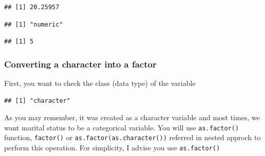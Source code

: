 \documentclass[
]{article}
\newenvironment{Shaded}{\begin{snugshade}}{\end{snugshade}}
\newcommand{\CommentTok}[1]{\textcolor[rgb]{0.56,0.35,0.01}{\textit{#1}}}
\newcommand{\FunctionTok}[1]{\textcolor[rgb]{0.13,0.29,0.53}{\textbf{#1}}}
\newcommand{\NormalTok}[1]{#1}
\newcommand{\OtherTok}[1]{\textcolor[rgb]{0.56,0.35,0.01}{#1}}
\newcommand{\SpecialCharTok}[1]{\textcolor[rgb]{0.81,0.36,0.00}{\textbf{#1}}}
\begin{document}
\begin{verbatim}
## [1] 20.25957
\end{verbatim}

\begin{Shaded}
\end{Shaded}

\begin{verbatim}
## [1] "numeric"
\end{verbatim}

\begin{Shaded}
\end{Shaded}

\begin{verbatim}
## [1] 5
\end{verbatim}

\hypertarget{converting-a-character-into-a-factor}{%
\subsubsection{Converting a character into a
factor}\label{converting-a-character-into-a-factor}}

First, you want to check the class (data type) of the variable

\begin{Shaded}
\end{Shaded}

\begin{verbatim}
## [1] "character"
\end{verbatim}

As you may remember, it was created as a character variable and most
times, we want marital status to be a categorical variable. You will use
\texttt{as.factor()} function, \texttt{factor()} or
\texttt{as.factor(as.character())} referred in nested approch to perform
this operation. For simplicity, I advise you use \texttt{as.factor()}

\begin{Shaded}
\end{Shaded}
\end{document}
